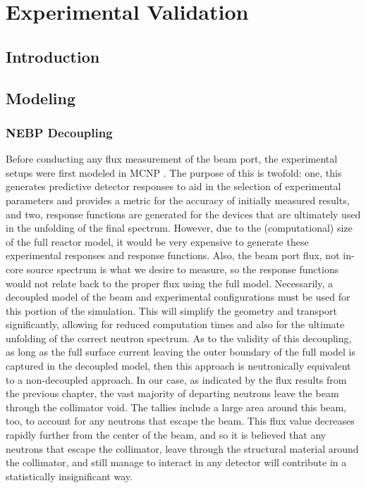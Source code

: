 
\cleardoublepage


\chapter{Experimental Validation}


\section{Introduction}

\section{Modeling}

\subsection{NEBP Decoupling}

Before conducting any flux measurement of the beam port, the experimental setups were first modeled in MCNP \cite{goorley2012initial}.
The purpose of this is twofold: one, this generates predictive detector responses to aid in the selection of experimental parameters and provides a metric for the accuracy of initially measured results, and two, response functions are generated for the devices that are ultimately used in the unfolding of the final spectrum.
However, due to the (computational) size of the full reactor model, it would be very expensive to generate these experimental responses and response functions.
Also, the beam port flux, not in-core source spectrum is what we desire to measure, so the response functions would not relate back to the proper flux using the full model.
Necessarily, a decoupled model of the beam and experimental configurations must be used for this portion of the simulation.
This will simplify the geometry and transport significantly, allowing for reduced computation times and also for the ultimate unfolding of the correct neutron spectrum.
As to the validity of this decoupling, as long as the full surface current leaving the outer boundary of the full model is captured in the decoupled model, then this approach is neutronically equivalent to a non-decoupled approach.
In our case, as indicated by the flux results from the previous chapter, the vast majority of departing neutrons leave the beam through the collimator void.
The tallies include a large area around this beam, too, to account for any neutrons that escape the beam.
This flux value decreases rapidly further from the center of the beam, and so it is believed that any neutrons that escape the collimator, leave through the structural material around the collimator, and still manage to interact in any detector will contribute in a statistically insignificant way.

